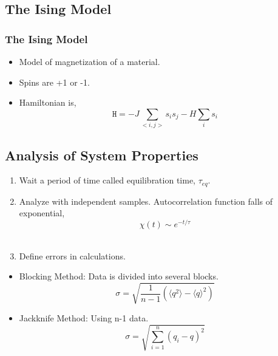 \documentclass[10pt]{beamer}
\begin{document}
\subsection{The Ising Model}
\begin{frame}
\frametitle{The Ising Model}
\begin{itemize}
\item Model of magnetization of a material. \\
\item Spins are +1 or -1. \\
\item Hamiltonian is,
\begin{equation}
\texttt{H} = - J \sum\limits_{<i,j>} s_i s_j - H\sum\limits_{i} s_i
\end{equation}
\end{itemize}
\end{frame}

\subsection{Analysis of System Properties}
\begin{frame}
\begin{enumerate}
\item Wait a period of time called equilibration time, $\tau_{eq}$. 
\item Analyze with independent samples.  
Autocorrelation function falls of exponential,
\begin{equation}
\chi (t) \sim e^{-t/ \tau}
\end{equation} \\
\item Define errors in calculations. 
\end{enumerate}
\begin{itemize}
\item Blocking Method: 
Data is divided into several blocks.
\begin{equation}
\sigma =  \sqrt{\frac{1}{n-1} (\langle q^2 \rangle - \langle q\rangle^2)}
\end{equation}
\item Jackknife Method: 
Using n-1 data. 
\begin{equation}
\sigma = \sqrt{\sum\limits_{i=1}^n (q_i - q )^2}
\end{equation}
\end{itemize}

\end{frame}
  
\end{document}
